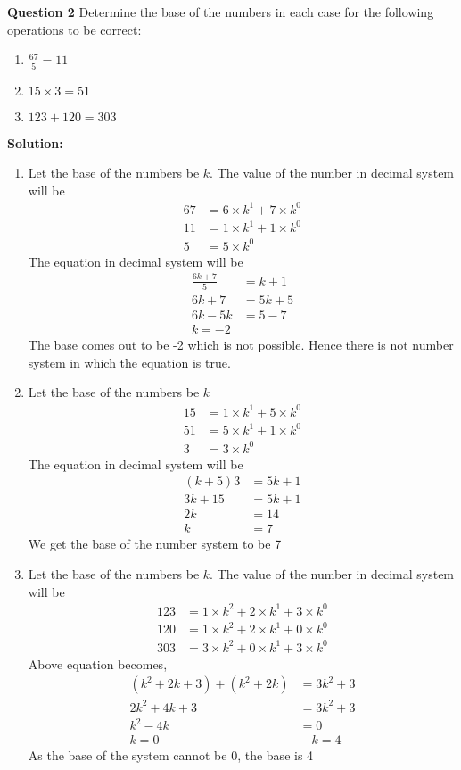 \documentclass{article}
\begin{document}
\textbf{Question 2}\newline
Determine the base of the numbers in each case for the following operations to be correct:
\begin{enumerate}
  \item $\frac{67}{5} = 11$ \\
  \item $15 \times 3 = 51$\\
  \item $123 + 120 = 303$
\end{enumerate}
\textbf{Solution:}\newline
\begin{enumerate}
  \item Let the base of the numbers be $k$. The value of the number in decimal system will be
    \begin{align*}
      67 &= 6 \times k^1 + 7 \times k^0 \\
      11 &= 1 \times k^1 + 1\times k^0\\
      5 &= 5 \times k^0
    \end{align*}
  The equation in decimal system will be
    \begin{align*}
	    \frac{6k + 7}{5} &= k+1\\
	    6k+7 &= 5k + 5\\
	    6k-5k &= 5-7\\ 
	    k = -2
    \end{align*}
 The base comes out to be -2 which is not possible. Hence there is not number system in which the equation is true. 
  \item Let the base of the numbers be $k$
    \begin{align*}
      15 &= 1 \times k^1 + 5 \times k^0 \\
      51 &= 5 \times k^1 + 1\times k^0\\
      3 &= 3 \times k^0
    \end{align*}
  The equation in decimal system will be
    \begin{align*}
	    (k + 5)3 &= 5k + 1\\
	    3k+15 &= 5k+1\\
	    2k &= 14\\
	    k &= 7
    \end{align*}
    We get the base of the number system to be 7
  \item Let the base of the numbers be $k$. The value of the number in decimal system will be
    \begin{align*}
      123 &= 1 \times k^2 + 2 \times k^1 + 3\times k^0 \\
      120 &= 1 \times k^2 + 2 \times k^1 + 0\times k^0\\
      303 &= 3 \times k^2 + 0 \times k^1 + 3\times k^0
    \end{align*}
  Above equation becomes,
    \begin{align*}
      (k^2 + 2k +3) + (k^2 + 2k) &= 3k^2 + 3\\
	    2k^2+4k+3 &= 3k^2+3\\
	    k^2-4k &= 0\\
	    k = 0 &\quad k = 4
    \end{align*}
    As the base of the system cannot be 0, the base is 4


\end{enumerate}
\end{document}
